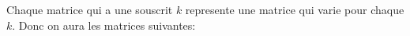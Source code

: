 \documentclass{article}
\begin{document}
Chaque matrice qui a une souscrit $k$ represente une matrice qui varie pour chaque $k$. Donc on aura les matrices suivantes:
\end{document}
